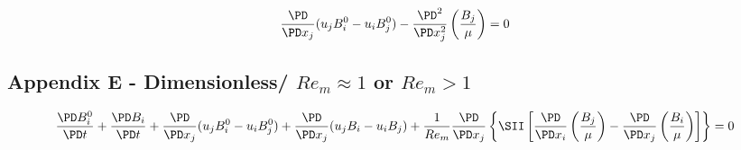 \documentclass[11pt]{article}
\begin{document}
\begin{equation*}
	\frac{\PD}{\PD x_j} (u_j B_i^0 - u_i B_j^0)
	-
	\frac{\PD^2}{\PD x_j^2}
	\left( \frac{B_j}{\mu} \right)
	=
	0
\end{equation*}


\subsection{Appendix E - Dimensionless/ \texorpdfstring{$Re_m \approx 1$ or $Re_m>1$}{LG}}

\begin{equation*}
	\frac{\PD B_i^0}{\PD t}
	+
	\frac{\PD B_i}{\PD t}
	+
	\frac{\PD}{\PD x_j} (u_j B_i^0 - u_i B_j^0)
	+
	\frac{\PD}{\PD x_j} (u_j B_i - u_i B_j)
	+
	\frac{1}{Re_m}
	\frac{\PD}{\PD x_j}
	\left\{ \SII
	\left[
	\frac{\PD}{\PD x_i}
	\left( \frac{B_j}{\mu} \right)
	-
	\frac{\PD}{\PD x_j}
	\left( \frac{B_i}{\mu} \right)
	\right]
	\right\}
	=
	0
\end{equation*}
\end{document}
